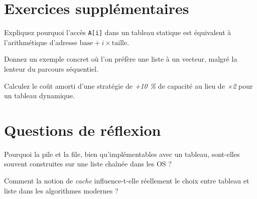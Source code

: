 \section*{Exercices supplémentaires}

\begin{exercice}
Expliquez pourquoi l’accès \lstinline|A[i]| dans un tableau statique
est équivalent à l’arithmétique d’adresse \(\text{base}+i\times\text{taille}\).
\end{exercice}

\begin{exercice}
Donnez un exemple concret où l’on préfère une liste à un vecteur,
malgré la lenteur du parcours séquentiel.
\end{exercice}

\begin{exercice}
Calculez le coût amorti d’une stratégie de \emph{+10 \%} de capacité
au lieu de \emph{×2} pour un tableau dynamique.
\end{exercice}

\section*{Questions de réflexion}

\begin{reflexion}
Pourquoi la pile et la file, bien qu’implémentables avec un tableau,
sont-elles souvent construites sur une liste chaînée dans les OS ?
\end{reflexion}

\begin{reflexion}
Comment la notion de \emph{cache} influence-t-elle réellement le choix
entre tableau et liste dans les algorithmes modernes ?
\end{reflexion}

